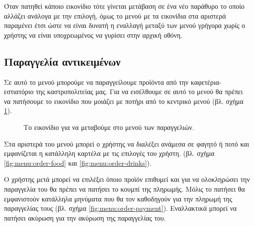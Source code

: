 \documentclass{assignment}
\begin{document}

Όταν πατηθεί κάποιο εικονίδιο τότε γίνεται μετάβαση σε ένα νέο παράθυρο το οποίο αλλάζει ανάλογα με την επιλογή, όμως το μενού με τα εικονίδια στα αριστερά παραμένει έτσι ώστε να είναι δυνατή η εναλλαγή μεταξύ των μενού γρήγορα χωρίς ο χρήστης να είναι υποχρεωμένος να γυρίσει στην αρχική οθόνη.

\subsection{Παραγγελία αντικειμένων}
\label{paraggelia}

Σε αυτό το μενού μπορούμε να παραγγείλουμε προϊόντα από την καφετέρια-εστιατόριο της καστροπολιτείας μας. Για να εισέλθουμε σε αυτό το μενού θα πρέπει να πατήσουμε το εικονίδιο που μοιάζει με ποτήρι από το κεντρικό μενού (βλ. σχήμα \ref{fig:icon:order}).

\begin{figure}
\begin{center}
\caption{Το εικονίδιο για να μεταβούμε στο μενού των παραγγελιών.}
\label{fig:icon:order}
\end{center}
\end{figure}

Στα αριστερά του μενού μπορεί ο χρήστης να διαλέξει ανάμεσα σε φαγητό ή ποτό και εμφανίζεται η κατάλληλη καρτέλα με τις επιλογές του χρήστη. (βλ. σχήμα \ref{fig:menu:order-food} και \ref{fig:menu:order-drinks}).

Ο χρήστης μετά μπορεί να επιλέξει όποιο προϊόν επιθυμεί και για να ολοκληρώσει την παραγγελία του θα πρέπει να πατήσει το κουμπί της πληρωμής. Μόλις το πατήσει θα εμφανιστούν κατάλληλα μηνύματα που θα τον καθοδηγούν για την πληρωμή της παραγγελίας τους (βλ. σχήμα \ref{fig:menu:order-payment}). Εναλλακτικά μπορεί να πατήσει ακύρωση για την ακύρωση της παραγγελίας του.
\end{document}
